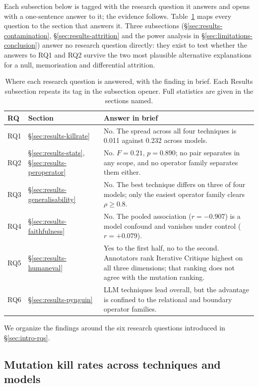 \documentclass[smallextended]{svjour3}
\begin{document}
Each subsection below is tagged with the research question it answers
and opens with a one-sentence answer to it; the evidence follows.
Table~\ref{tab:rqmap} maps every question to the section that
answers it.
Three subsections (\S\ref{sec:results-contamination},
\S\ref{sec:results-attrition} and the power analysis in
\S\ref{sec:limitations-conclusion}) answer no research question
directly: they exist to test whether the answers to RQ1 and RQ2
survive the two most plausible alternative explanations for a null,
memorisation and differential attrition.

\begin{table}[htbp]
\centering
\caption{Where each research question is answered, with the finding in
brief. Each Results subsection repeats its tag in the subsection
opener. Full statistics are given in the sections named.}\label{tab:rqmap}
\small
\begin{tabular}{@{}llp{}@{}}
\toprule
RQ & Section & Answer in brief \\
\midrule
RQ1 & \S\ref{sec:results-killrate} &
 No. The spread across all four techniques is 0.011 against 0.232
 across models. \\
RQ2 & \S\ref{sec:results-stats}, \S\ref{sec:results-peroperator} &
 No. $F = 0.21$, $p = 0.890$; no pair separates in any scope, and
 no operator family separates them either. \\
RQ3 & \S\ref{sec:results-generalisability} &
 No. The best technique differs on three of four models; only the
 easiest operator family clears $\rho \geq 0.8$. \\
RQ4 & \S\ref{sec:results-faithfulness} &
 No. The pooled association ($r = -0.907$) is a model confound and
 vanishes under control ($r = +0.079$). \\
RQ5 & \S\ref{sec:results-humaneval} &
 Yes to the first half, no to the second. Annotators rank Iterative
 Critique highest on all three dimensions; that ranking does not
 agree with the mutation ranking. \\
RQ6 & \S\ref{sec:results-pynguin} &
 LLM techniques lead overall, but the advantage is confined to the
 relational and boundary operator families. \\
\bottomrule
\end{tabular}
\end{table}

We organize the findings around the six research questions
introduced in \S\ref{sec:intro-rqs}.

\subsection{Mutation kill rates across techniques and models}
\end{document}
